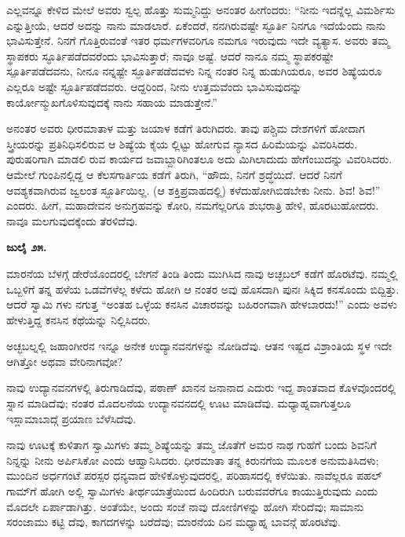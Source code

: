 ಎಲ್ಲವನ್ನೂ ಕೇಳಿದ ಮೇಲೆ ಅವರು ಸ್ವಲ್ಪ ಹೊತ್ತು ಸುಮ್ಮನಿದ್ದು ಅನಂತರ ಹೀಗೆಂದರು: “ನೀನು ಇದನ್ನೆಲ್ಲ ವಿಮರ್ಶಿಸು ಎನ್ನುತ್ತೀಯೆ, ಆದರೆ ಅದನ್ನು ನಾನು ಮಾಡಲಾರೆ. ಏಕೆಂದರೆ, ನನಗಿರುವಷ್ಟೇ ಸ್ಫೂರ್ತಿ ನಿನಗೂ ಇದೆಯೆಂದು ನಾನು ಭಾವಿಸುತ್ತೇನೆ. ನಿನಗೆ ಗೊತ್ತಿರುವಂತೆ ಇತರ ಧರ್ಮಗಳವರಿಗೂ ನಮಗೂ ಇರುವುದು ಇದೇ ವ್ಯತ್ಯಾಸ. ಅವರು ತಮ್ಮ ಸ್ಥಾಪಕರು ಸ್ಫೂರ್ತಿಪಡೆದವರೆಂದು ಭಾವಿಸುತ್ತಾರೆ; ನಾವೂ ಅಷ್ಟೆ. ಆದರೆ ನಾನೂ ನಮ್ಮ ಸ್ಥಾಪಕರಷ್ಟೇ ಸ್ಪೂರ್ತಿಪಡೆದವನು, ನೀನೂ ನನ್ನಷ್ಟೇ ಸ್ಫೂರ್ತಿಪಡೆದವಳು ನಿನ್ನ ನಂತರ ನಿನ್ನ ಹುಡುಗಿಯರೂ, ಅವರ ಶಿಷ್ಯೆಯರೂ ಎಲ್ಲರೂ ಅಷ್ಟೇ ಸ್ಫೂರ್ತಿಪಡೆದವರು. ಆದ್ದರಿಂದ, ನೀನು ಉತ್ತಮವೆಂದು ಭಾವಿಸುವುದನ್ನು ಕಾರ್ಯೋನ್ಮುಖಗೊಳಿಸುವುದಕ್ಕೆ ನಾನು ಸಹಾಯ ಮಾಡುತ್ತೇನೆ.”

ಅನಂತರ ಅವರು ಧೀರಮಾತಾಳ ಮತ್ತು ಜಯಾಳ ಕಡೆಗೆ ತಿರುಗಿದರು. ತಾವು ಪಶ್ಚಿಮ ದೇಶಗಳಿಗೆ ಹೋದಾಗ ಸ್ತ್ರೀಯರನ್ನು ಪ್ರತಿನಿಧಿಸಲಿರುವ ಆ ಶಿಷ್ಯೆಯ ಕೈಯ ಲ್ಲಿಟ್ಟು ಹೋಗುವ ನ್ಯಾಸದ ಹಿರಿಮೆಯನ್ನು ವಿವರಿಸಿದರು. ಪುರುಷರಿಗಾಗಿ ಮಾಡಲಿ ರುವ ಕಾರ್ಯದ ಜವಾಬ್ದಾರಿಗಿಂತಲೂ ಅದು ಮಿಗಿಲಾದುದು ಹೇಗೆಂಬುದನ್ನು ವಿವರಿಸಿದರು. ಆಮೇಲೆ ಗುಂಪಿನಲ್ಲಿದ್ದ ಆ ಕೆಲಸಗಾರ್ತಿಯ ಕಡೆಗೆ ತಿರುಗಿ, “ಹೌದು, ನಿನಗೆ ಶ್ರದ್ಧೆಯಿದೆ. ಆದರೆ ನಿನಗೆ ಆವಶ್ಯಕವಾಗಿರುವ ಜ್ವಲಂತ ಸ್ಫೂರ್ತಿಯಿಲ್ಲ. (ಆ ಶಕ್ತಿಪ್ರವಾಹದಲ್ಲಿ) ಕಳೆದುಹೋಗಿಬಿಡಬೇಕು ನೀನು. ಶಿವ! ಶಿವ!” ಎಂದರು. ಹೀಗೆ, ಮಹಾದೇವನ ಅನುಗ್ರಹವನ್ನು ಕೋರಿ, ನಮಗೆಲ್ಲರಿಗೂ ಶುಭರಾತ್ರಿ ಹೇಳಿ, ಹೊರಟುಹೋದರು. ನಾವೂ ಮಲಗುವುದಕ್ಕೆಂದು ತೆರಳಿದೆವು.

\textbf{ಜುಲೈ ೨೫.}

ಮಾರನೆಯ ಬೆಳಗ್ಗೆ ಡೇರೆಯೊಂದರಲ್ಲಿ ಬೇಗನೆ ತಿಂಡಿ ತಿಂದು ಮುಗಿಸಿದ ನಾವು ಅಚ್ಛಬಲ್ ಕಡೆಗೆ ಹೊರಟೆವು. ನಮ್ಮಲ್ಲಿ ಒಬ್ಬಳಿಗೆ ತನ್ನ ಹಳೆಯ ಒಡವೆಗಳೆಲ್ಲ ಕಳೆದು ಹೋಗಿ ಆ ನಂತರ ಅವು ಹೊಸದಾಗಿ ಪುನಃ ಸಿಕ್ಕಿದ ಕನಸೊಂದು ಬಿದ್ದಿತ್ತು. ಆದರೆ ಸ್ವಾಮಿ ಗಳು ನಗುತ್ತ “ಅಂತಹ ಒಳ್ಳೆಯ ಕನಸಿನ ವಿಚಾರವನ್ನು ಬಹಿರಂಗವಾಗಿ ಹೇಳಬಾರದು!” ಎಂದು ಅವಳು ಹೇಳುತ್ತಿದ್ದ ಕನಸಿನ ಕಥೆಯನ್ನು ನಿಲ್ಲಿಸಿದರು.

ಅಚ್ಛಬಲ್ನಲ್ಲಿ ಜಹಾಂಗೀರನ ಇನ್ನೂ ಅನೇಕ ಉದ್ಯಾನವನಗಳನ್ನು ನೋಡಿದೆವು. ಆತನ ಇಷ್ಟದ ವಿಶ್ರಾಂತಿಯ ಸ್ಥಳ ಇದೇ ಆಗಿತ್ತೋ ಅಥವಾ ವೇರಿನಾಗವೋ?

ನಾವು ಉದ್ಯಾನವನಗಳಲ್ಲಿ ತಿರುಗಾಡಿದೆವು, ಪಠಾಣ್ ಖಾನನ ಜನಾನಾದ ಎದುರು ಇದ್ದ ಶಾಂತವಾದ ಕೊಳವೊಂದರಲ್ಲಿ ಸ್ನಾನ ಮಾಡಿದೆವು; ನಂತರ ಮೊದಲನೆಯ ಉದ್ಯಾನವನದಲ್ಲಿ ಊಟ ಮಾಡಿದೆವು. ಮಧ್ಯಾಹ್ನವಾಗುತ್ತಲೂ ಇಸ್ಲಾಮಾಬಾದ್ಗೆ ಪ್ರಯಾಣ ಬೆಳೆಸಿದೆವು.

ನಾವು ಊಟಕ್ಕೆ ಕುಳಿತಾಗ ಸ್ವಾಮಿಗಳು ತಮ್ಮ ಶಿಷ್ಯೆಯನ್ನು ತಮ್ಮ ಜೊತೆಗೆ ಅಮರ ನಾಥ ಗುಹೆಗೆ ಬಂದು ಶಿವನಿಗೆ ನಿನ್ನನ್ನು ನೀನು ಅರ್ಪಿಸಿಕೋ ಎಂದು ಆಹ್ವಾನಿಸಿದರು. ಧೀರಮಾತಾ ತನ್ನ ಕಿರುನಗೆಯ ಮೂಲಕ ಅನುಮತಿಸಿದಳು; ಮುಂದಿನ ಅರ್ಧಗಂಟೆ ಪರಸ್ಪರ ಧನ್ಯವಾದ ಹೇಳಿಕೊಳ್ಳುವುದರಲ್ಲಿ, ಪರಿಹಾಸದಲ್ಲಿ ಕಳೆಯಿತು. ನಾವೆಲ್ಲರೂ ಪಹಲ್ ಗಾಮ್​ಗೆ ಹೋಗಿ ಅಲ್ಲಿ ಸ್ವಾಮಿಗಳು ತೀರ್ಥಯಾತ್ರೆಯಿಂದ ಹಿಂದಿರುಗಿ ಬರುವವರೆಗೂ ಕಾಯುತ್ತಿರುವುದು ಎಂದು ಮೊದಲೇ ಏರ್ಪಾಡಾಗಿತ್ತು. ಅಂತೆಯೇ, ಅಂದು ಸಂಜೆ ನಾವು ದೋಣಿಗಳನ್ನು ಹೋಗಿ ಸೇರಿದೆವು; ಸಾಮಾನು ಸರಂಜಾಮು ಕಟ್ಟಿ ದೆವು, ಕಾಗದಗಳನ್ನು ಬರೆದೆವು; ಮಾರನೆಯ ದಿನ ಮಧ್ಯಾಹ್ನ ಬಾವನ್ಗೆ ಹೊರಟೆವು.

